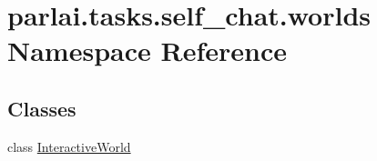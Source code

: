 \hypertarget{namespaceparlai_1_1tasks_1_1self__chat_1_1worlds}{}\section{parlai.\+tasks.\+self\+\_\+chat.\+worlds Namespace Reference}
\label{namespaceparlai_1_1tasks_1_1self__chat_1_1worlds}
\subsection*{Classes}
\begin{DoxyCompactItemize}
\item 
class \hyperlink{classparlai_1_1tasks_1_1self__chat_1_1worlds_1_1InteractiveWorld}{Interactive\+World}
\end{DoxyCompactItemize}
